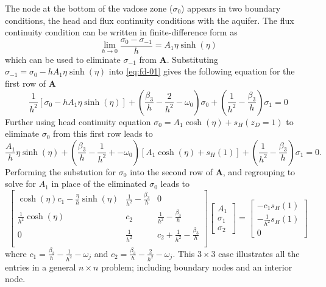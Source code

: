 \documentclass[12pt,letterpaper]{article}
\begin{document}
The node at the bottom of the vadose zone ($\sigma_0$) appears in two
boundary conditions, the head and flux continuity conditions with the
aquifer.  The flux continuity condition can be written in
finite-difference form as
\begin{equation}
 \nonumber
  \lim_{h \rightarrow 0} \frac{\sigma_0 - \sigma_{-1}}{h} = A_1 \eta \sinh(\eta)
\end{equation}
which can be used to eliminate $\sigma_{-1}$ from $\mathbf{A}$.
Substituting $\sigma_{-1} = \sigma_0 - hA_1 \eta \sinh(\eta)$ into
\eqref{eq:fd-01} gives the following equation for the first row of
$\mathbf{A}$
\begin{equation}
  \nonumber
  \frac{1}{h^2} \left[ \sigma_0 - hA_1 \eta \sinh(\eta)\right] +
  \left(\frac{\beta_3}{h} - \frac{2}{h^2}  - \omega_0\right) \sigma_0
  + \left(\frac{1}{h^2} - \frac{\beta_3}{h}\right) \sigma_1 = 0
\end{equation}
Further using head continuity equation $\sigma_0 = A_1 \cosh(\eta) +
s_{H}(z_D=1)$ to eliminate $\sigma_0$ from this first row leads to
\begin{equation}
 \nonumber
    \frac{A_1}{h}  \eta \sinh(\eta) +
  \left( \frac{\beta_3}{h} - \frac{1}{h^2} + - \omega_0\right) \left[
    A_1 \cosh(\eta) + s_{H}(1)\right] + \left(\frac{1}{h^2} -
    \frac{\beta_3}{h}\right) \sigma_1 = 0.
\end{equation}
Performing the substution for $\sigma_0$ into the second row of
$\mathbf{A}$, and regrouping to solve for $A_1$ in place of the
eliminated $\sigma_0$ leads to
 \begin{equation}
  \label{eq:fd-02}
  \left[ \begin{matrix}
     \cosh(\eta)c_1 - \frac{\eta}{h} \sinh(\eta) &
    \frac{1}{h^2} - \frac{\beta_3}{h} & 0 \\ 
     \frac{1}{h^2}\cosh(\eta) & c_2 &
    \frac{1}{h^2} - \frac{\beta_3}{h}   \\ 
     0 & \frac{1}{h^2} & c_2 +
    \frac{1}{h^2} - \frac{\beta_3}{h} \\ 
  \end{matrix}\right] 
\left[\begin{matrix}
A_1 \\ \sigma_1 \\ \sigma_2 
\end{matrix}\right]
=
\left[\begin{matrix}
-c_1 s_H(1) \\ 
-\frac{1}{h^2}s_H(1) \\ 0 
\end{matrix}\right]
\end{equation}
where $c_1 = \frac{\beta_3}{h} - \frac{1}{h^2} - \omega_j$ and $c_2 =
\frac{\beta_3}{h} - \frac{2}{h^2} - \omega_j $.  This 
$3\times 3$ case illustrates all the entries in a general $n\times
n$ problem; including boundary nodes and an interior node.  
\end{document}
